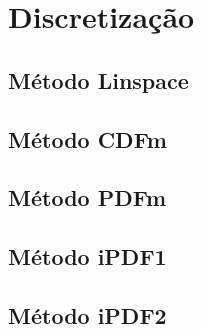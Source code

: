 \chapter{Discretização}
\vspace{-2cm}
\section{Método Linspace} \label{cap:anexoLin}

\section{Método CDFm} \label{cap:anexoCDFm}

\section{Método PDFm} \label{cap:anexoPDFm}

\section{Método iPDF1} \label{cap:anexoiPDF1}

\section{Método iPDF2} \label{cap:anexoiPDF2}